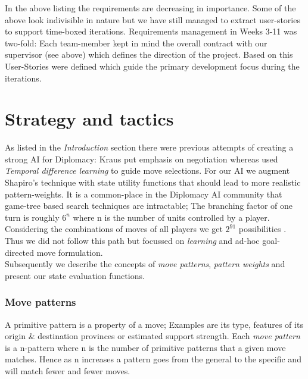 \documentclass[pdftex,12pt,a4paper]{report}
\begin{document}
In the above listing the requirements are decreasing in
importance. Some of the above look indivisible in nature but we have
still managed to extract user-stories to support time-boxed
iterations. Requirements management in Weeks 3-11 was two-fold: Each
team-member kept in mind the overall contract with our supervisor (see
above) which defines the direction of the project.  Based on this
User-Stories were defined which guide the primary development focus
during the iterations.


\pagebreak

\section{Strategy and tactics}

As listed in the \textit{Introduction} section there were previous
attempts of creating a strong AI for Diplomacy: Kraus \cite{Kraus95}
put emphasis on negotiation whereas \cite{Shapiro02} used
\textit{Temporal difference learning} to guide move selections. For
our AI we augment Shapiro's technique with state utility functions
that should lead to more realistic pattern-weights. It is a
common-place in the Diplomacy AI community that game-tree based search
techniques are intractable; The branching factor of one turn
is roughly $6^{n}$ where n is the number of units controlled by a
player. Considering the combinations of moves of all players we get
$2^{91}$ possibilities \cite{Shapiro02}. Thus we did not follow this
path but focussed on \textit{learning} and ad-hoc goal-directed move
formulation. \\

Subsequently we describe the concepts of \textit{move patterns},
\textit{pattern weights} and present our state evaluation functions.

\subsubsection{Move patterns}

A primitive pattern is a property of a move; Examples are its type,
features of its origin \& destination provinces or estimated support
strength. Each \textit{move pattern} is a n-pattern where n is the
number of primitive patterns that a given move matches. Hence as n
increases a pattern goes from the general to the specific and will
match fewer and fewer moves. \\
\end{document}
